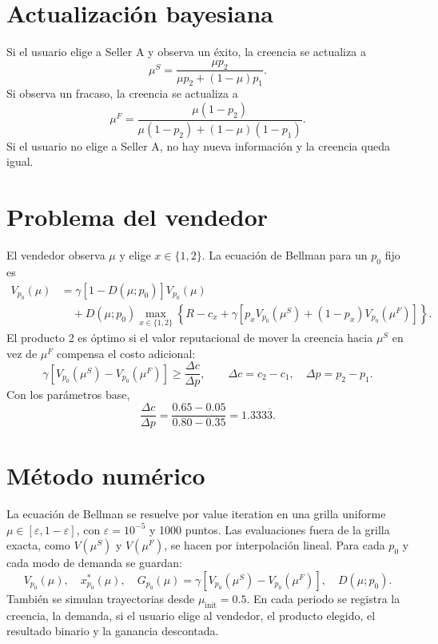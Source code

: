 \documentclass[11pt]{article}
\begin{document}
\section{Actualización bayesiana}

Si el usuario elige a Seller A y observa un éxito, la creencia se actualiza a
\[
\mu^S
=
\frac{\mu p_2}
{\mu p_2+(1-\mu)p_1}.
\]
Si observa un fracaso, la creencia se actualiza a
\[
\mu^F
=
\frac{\mu(1-p_2)}
{\mu(1-p_2)+(1-\mu)(1-p_1)}.
\]
Si el usuario no elige a Seller A, no hay nueva información y la creencia queda
igual.

\section{Problema del vendedor}

El vendedor observa \(\mu\) y elige \(x\in\{1,2\}\). La ecuación de Bellman para
un \(p_0\) fijo es
\[
\begin{aligned}
V_{p_0}(\mu)
&=
\gamma[1-D(\mu;p_0)]V_{p_0}(\mu) \\
&\quad
+D(\mu;p_0)\max_{x\in\{1,2\}}
\left\{
R-c_x
+\gamma\left[
p_xV_{p_0}(\mu^S)
+(1-p_x)V_{p_0}(\mu^F)
\right]
\right\}.
\end{aligned}
\]
El producto 2 es óptimo si el valor reputacional de mover la creencia hacia
\(\mu^S\) en vez de \(\mu^F\) compensa el costo adicional:
\[
\gamma\left[V_{p_0}(\mu^S)-V_{p_0}(\mu^F)\right]
\ge
\frac{\Delta c}{\Delta p},
\qquad
\Delta c=c_2-c_1,
\quad
\Delta p=p_2-p_1.
\]
Con los parámetros base,
\[
\frac{\Delta c}{\Delta p}
=\frac{0.65-0.05}{0.80-0.35}
=1.333\overline{3}.
\]

\section{Método numérico}

La ecuación de Bellman se resuelve por value iteration en una grilla uniforme
\(\mu\in[\varepsilon,1-\varepsilon]\), con \(\varepsilon=10^{-5}\) y 1000 puntos.
Las evaluaciones fuera de la grilla exacta, como \(V(\mu^S)\) y \(V(\mu^F)\), se
hacen por interpolación lineal. Para cada \(p_0\) y cada modo de demanda se
guardan:
\[
V_{p_0}(\mu), \quad
x^*_{p_0}(\mu), \quad
G_{p_0}(\mu)
=
\gamma[V_{p_0}(\mu^S)-V_{p_0}(\mu^F)],
\quad
D(\mu;p_0).
\]
También se simulan trayectorias desde \(\mu_{\mathrm{init}}=0.5\). En cada
periodo se registra la creencia, la demanda, si el usuario elige al vendedor, el
producto elegido, el resultado binario y la ganancia descontada.
\end{document}
